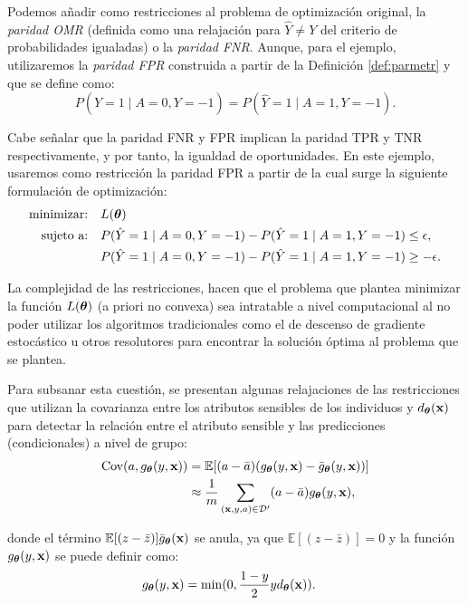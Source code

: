 \documentclass[oneside,openright,titlepage,numbers=noenddot,openany,headinclude,footinclude=true,
cleardoublepage=empty,abstractoff,BCOR=5mm,paper=a4,fontsize=12pt,main=spanish]{scrreprt}
\begin{document}
Podemos añadir como restricciones al problema de optimización original, la \textit{paridad OMR} (definida como una relajación para $\hat{Y}\neq Y$ del criterio de probabilidades igualadas) o la \textit{paridad FNR}. Aunque, para el ejemplo, utilizaremos la \textit{paridad FPR} construida a partir de la Definición \ref{def:parmetr} y que se define como: $$P(\hat{Y}=1 \mid A=0, Y=-1)=P(\hat{Y}=1 \mid A=1, Y=-1).$$

\clearpage

Cabe señalar que la paridad FNR y FPR implican la paridad TPR y TNR respectivamente, y por tanto, la igualdad de oportunidades. En este ejemplo, usaremos como restricción la paridad FPR a partir de la cual surge la siguiente formulación de optimización:
\begin{equation}\label{eq:restricciones}
\begin{split}
\text{minimizar:} &\quad L(\bm{\theta})\\
\text{sujeto a:} &\quad P(\hat{Y}=1 \mid A=0, Y=-1)-P(\hat{Y}=1 \mid A=1, Y=-1) \leq \epsilon,\\
&\quad  P(\hat{Y}=1 \mid A=0, Y=-1)-P(\hat{Y}=1 \mid A=1, Y=-1) \geq -\epsilon.
\end{split}
\end{equation}

La complejidad de las restricciones, hacen que el problema que plantea minimizar la función $L(\bm{\theta})$ (a priori no convexa) sea intratable a nivel computacional al no poder utilizar los algoritmos tradicionales como el de descenso de gradiente estocástico u otros resolutores para encontrar la solución óptima al problema que se plantea. 

Para subsanar esta cuestión, se presentan algunas relajaciones de las restricciones que utilizan la covarianza entre los atributos sensibles de los individuos y $d_{\bm{\theta}}(\textbf{x})$ para detectar la relación entre el atributo sensible y las predicciones (condicionales) a nivel de grupo:
\begin{equation*}
\begin{split}
\text{Cov}(a,g_{\bm{\theta}}(y,\textbf{x}))&=\mathbb{E}[(a-\bar{a})(g_{\bm{\theta}}(y,\textbf{x})-\bar{g}_{\bm{\theta}}(y,\textbf{x}))]\\
&\approx \frac{1}{m} \sum_{(\textbf{x},y,a)\in \mathcal{D}'}(a-\bar{a})g_{\bm{\theta}}(y,\textbf{x}),
\end{split}
\end{equation*}

donde el término $\mathbb{E}[(z-\bar{z})]\bar{g}_{\bm{\theta}}(\textbf{x})$ se anula, ya que $\mathbb{E}[(z-\bar{z})]=0$ y la función $g_{\bm{\theta}}(y,\textbf{x})$ se puede definir como:
\begin{equation*}
\begin{split}
g_{\bm{\theta}}(y,\textbf{x})&=\min (0,\frac{1-y}{2} y d_{\bm{\theta}} (\textbf{x})).
\end{split}
\end{equation*}
\end{document}
